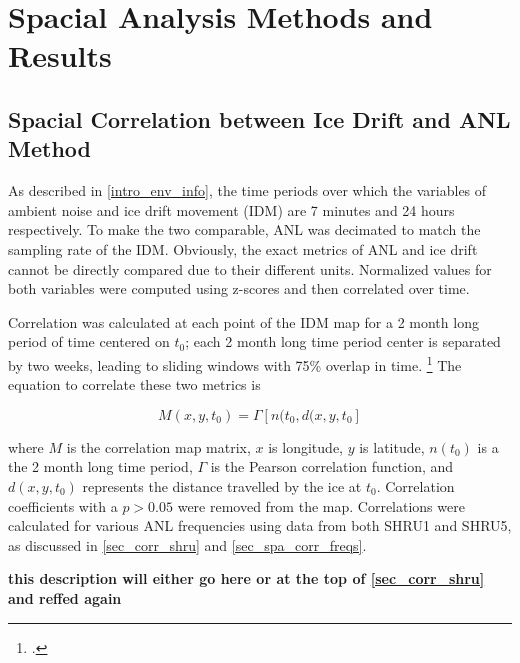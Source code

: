 \section{Spacial Analysis Methods and Results}


\subsection{Spacial Correlation between Ice Drift and ANL Method} \label{sec_corr_method}

As described in \autoref{intro_env_info}, the time periods over which the variables of ambient noise and ice drift movement (IDM) are 7 minutes and 24 hours respectively. To make the two comparable, ANL was decimated to match the sampling rate of the IDM. Obviously, the exact metrics of ANL and ice drift cannot be directly compared due to their different units. Normalized values for both variables were computed using z-scores and then correlated over time. 

Correlation was calculated at each point of the IDM map for a 2 month long period of time centered on $t_{0}$; each 2 month long time period center is separated by two weeks, leading to sliding windows with 75\% overlap in time. \footcite[]{Bonnel2021} The equation to correlate these two metrics is 

\begin{equation}    \label{eq_spacialcorr}
    M(x,y,t_{0})=\Gamma [n(t_{0},d(x,y,t_{0}]
\end{equation}
 
where $M$ is the correlation map matrix, $x$ is longitude, $y$ is latitude, $n(t_0)$ is a the 2 month long time period, $\Gamma$ is the Pearson correlation function, and $d(x,y,t_{0})$ represents the distance travelled by the ice at $t_0$. Correlation coefficients with a $p>0.05$ were removed from the map. Correlations were calculated for various ANL frequencies using data from both SHRU1 and SHRU5, as discussed in \autoref{sec_corr_shru} and \autoref{sec_spa_corr_freqs}. %

\textbf{this description will either go here or at the top of \autoref{sec_corr_shru} and reffed again}

